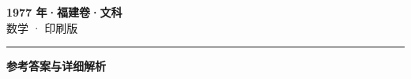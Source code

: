 \documentclass[zihao=5, a4paper]{ctexart}
\begin{document}
\begin{center}
  {\Large\bfseries 1977 年·福建卷·文科}\\[4pt]
  {\large 数学 · 印刷版}
\end{center}
\medskip
{}

\par\bigskip\hrule\bigskip
{}
\begin{center}{\large\bfseries 参考答案与详细解析}\end{center}
\smallskip

\end{document}

